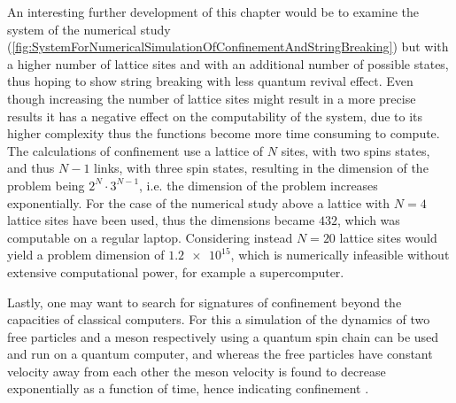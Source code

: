 \documentclass[../main.tex]{subfiles} %
\begin{document}
An interesting further development of this chapter would be to examine the system of the numerical study (\cref{fig:SystemForNumericalSimulationOfConfinementAndStringBreaking}) but with a higher number of lattice sites and with an additional number of possible states, thus hoping to show string breaking with less quantum revival effect. Even though increasing the number of lattice sites might result in a more precise results it has a negative effect on the computability of the system, due to its higher complexity thus the functions become more time consuming to compute. The calculations of confinement use a lattice of $N$ sites, with two spins states, and thus $N-1$ links, with three spin states, resulting in the dimension of the problem being $2^N \cdot 3^{N-1}$, i.e. the dimension of the problem increases exponentially. For the case of the numerical study above a lattice with $N=4$ lattice sites have been used, thus the dimensions became $432$, which was computable on a regular laptop. Considering instead $N=20$ lattice sites would yield a problem dimension of $\num{1.2e15}$, which is numerically infeasible without extensive computational power, for example a supercomputer.

Lastly, one may want to search for signatures of confinement beyond the capacities of classical computers. For this a simulation of the dynamics of two free particles and a meson respectively using a quantum spin chain can be used and run on a quantum computer, and whereas the free particles have constant velocity away from each other the meson velocity is found to decrease exponentially as a function of time, hence indicating confinement \cite{vovrosh_confinementDynamicsOnQuantumComputer_2020}.
\end{document}
